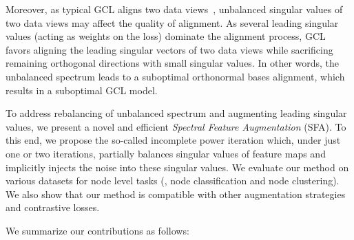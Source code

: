 Moreover, as typical GCL aligns two data views~\citep{wang2020understanding}, unbalanced singular values of two data views may affect the quality of alignment. As several leading singular values  (acting as weights on the loss) dominate the alignment process, GCL favors aligning the leading singular vectors of two data views while sacrificing remaining orthogonal directions with small singular values. In other words, the unbalanced spectrum leads to a suboptimal orthonormal bases alignment, which results in a suboptimal GCL model.

To address rebalancing of unbalanced spectrum and augmenting leading singular values, we present a novel and efficient {\em Spectral Feature Augmentation} (SFA).
To this end, we propose the so-called incomplete power iteration which, under just one or two iterations, partially balances singular values of feature maps and implicitly injects the noise into these singular values. %
We evaluate our method on various datasets for node level tasks (\ie, node classification and node clustering). We also
show that our  method is compatible with other augmentation strategies and contrastive losses.

\vspace{0.15cm}

We summarize our contributions as follows:

